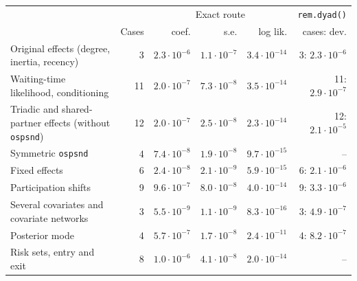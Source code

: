 \begin{tabular}{@{}p{5.6cm}rrrrr@{}}\toprule
& & \multicolumn{3}{c}{Exact route} & \texttt{rem.dyad()}\\
& Cases & coef. & s.e. & log lik. & cases: dev.\\\midrule
Original effects (degree, inertia, recency) & 3 & $2.3\cdot10^{-6}$ & $1.1\cdot10^{-7}$ & $3.4\cdot10^{-14}$ & 3: $2.3\cdot10^{-6}$ \\
Waiting-time likelihood, conditioning & 11 & $2.0\cdot10^{-7}$ & $7.3\cdot10^{-8}$ & $3.5\cdot10^{-14}$ & 11: $2.9\cdot10^{-7}$ \\
Triadic and shared-partner effects (without \texttt{ospsnd}) & 12 & $2.0\cdot10^{-7}$ & $2.5\cdot10^{-8}$ & $2.3\cdot10^{-14}$ & 12: $2.1\cdot10^{-5}$ \\
Symmetric \texttt{ospsnd} & 4 & $7.4\cdot10^{-8}$ & $1.9\cdot10^{-8}$ & $9.7\cdot10^{-15}$ & -- \\
Fixed effects & 6 & $2.4\cdot10^{-8}$ & $2.1\cdot10^{-9}$ & $5.9\cdot10^{-15}$ & 6: $2.1\cdot10^{-6}$ \\
Participation shifts & 9 & $9.6\cdot10^{-7}$ & $8.0\cdot10^{-8}$ & $4.0\cdot10^{-14}$ & 9: $3.3\cdot10^{-6}$ \\
Several covariates and covariate networks & 3 & $5.5\cdot10^{-9}$ & $1.1\cdot10^{-9}$ & $8.3\cdot10^{-16}$ & 3: $4.9\cdot10^{-7}$ \\
Posterior mode & 4 & $5.7\cdot10^{-7}$ & $1.7\cdot10^{-8}$ & $2.4\cdot10^{-11}$ & 4: $8.2\cdot10^{-7}$ \\
Risk sets, entry and exit & 8 & $1.0\cdot10^{-6}$ & $4.1\cdot10^{-8}$ & $2.0\cdot10^{-14}$ & -- \\
\bottomrule\end{tabular}
